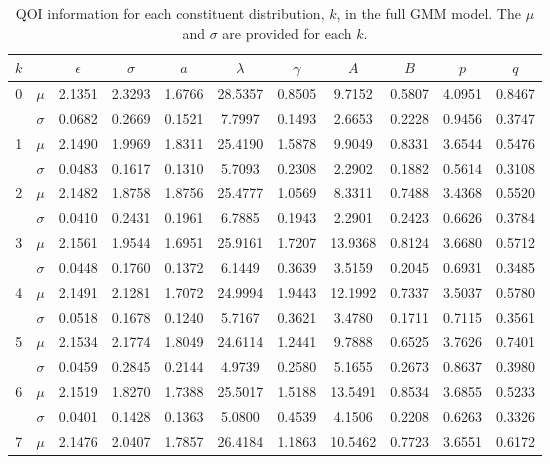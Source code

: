 \begin{table}[ht]
	\centering
	\caption{QOI information for each constituent distribution, $k$, in the full GMM model.  The $\mu$ and $\sigma$ are provided for each $k$.}
  \label{tbl:sw_all_gmm_parameters}
  \begin{tabular}{ccccccccccc}
    \hline
    $k$ & & $\epsilon$ & $\sigma$ & $a$ & $\lambda$ & $\gamma$ & $A$ & $B$ & $p$ & $q$\\
    \hline
    0 & $\mu$     & 2.1351 & 2.3293 & 1.6766 & 28.5357 & 0.8505 &  9.7152 & 0.5807 & 4.0951 & 0.8467\\
      & $\sigma$  & 0.0682 & 0.2669 & 0.1521 &  7.7997 & 0.1493 &  2.6653 & 0.2228 & 0.9456 & 0.3747\\
    1 & $\mu$     & 2.1490 & 1.9969 & 1.8311 & 25.4190 & 1.5878 &  9.9049 & 0.8331 & 3.6544 & 0.5476\\
      & $\sigma$  & 0.0483 & 0.1617 & 0.1310 &  5.7093 & 0.2308 &  2.2902 & 0.1882 & 0.5614 & 0.3108\\
    2 & $\mu$     & 2.1482 & 1.8758 & 1.8756 & 25.4777 & 1.0569 &  8.3311 & 0.7488 & 3.4368 & 0.5520\\
      & $\sigma$  & 0.0410 & 0.2431 & 0.1961 &  6.7885 & 0.1943 &  2.2901 & 0.2423 & 0.6626 & 0.3784\\
    3 & $\mu$     & 2.1561 & 1.9544 & 1.6951 & 25.9161 & 1.7207 & 13.9368 & 0.8124 & 3.6680 & 0.5712\\
      & $\sigma$  & 0.0448 & 0.1760 & 0.1372 &  6.1449 & 0.3639 &  3.5159 & 0.2045 & 0.6931 & 0.3485\\
    4 & $\mu$     & 2.1491 & 2.1281 & 1.7072 & 24.9994 & 1.9443 & 12.1992 & 0.7337 & 3.5037 & 0.5780\\
      & $\sigma$  & 0.0518 & 0.1678 & 0.1240 &  5.7167 & 0.3621 &  3.4780 & 0.1711 & 0.7115 & 0.3561\\
    5 & $\mu$     & 2.1534 & 2.1774 & 1.8049 & 24.6114 & 1.2441 &  9.7888 & 0.6525 & 3.7626 & 0.7401\\
      & $\sigma$  & 0.0459 & 0.2845 & 0.2144 &  4.9739 & 0.2580 &  5.1655 & 0.2673 & 0.8637 & 0.3980\\
    6 & $\mu$     & 2.1519 & 1.8270 & 1.7388 & 25.5017 & 1.5188 & 13.5491 & 0.8534 & 3.6855 & 0.5233\\
      & $\sigma$  & 0.0401 & 0.1428 & 0.1363 &  5.0800 & 0.4539 &  4.1506 & 0.2208 & 0.6263 & 0.3326\\
    7 & $\mu$     & 2.1476 & 2.0407 & 1.7857 & 26.4184 & 1.1863 & 10.5462 & 0.7723 & 3.6551 & 0.6172\\

\end{tabular}
\end{table}
